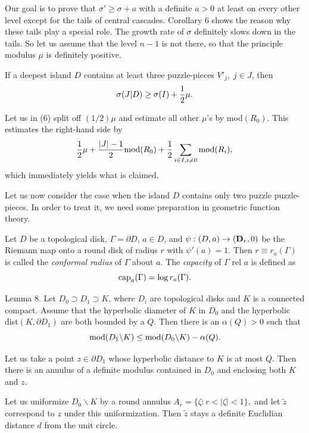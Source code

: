 \medskip{}
Our goal is to prove that $\sigma'\geq\sigma+a$ with
a definite $a>0$ at least on every other level except for the tails
of central cascades.
Corollary 6 shows the reason why these tails play a special
role. The  growth rate of $\sigma$ definitely slows down in the
tails. So let us assume that the level
 $n-1$ is not there, so that the principle modulus $\mu$ is definitely
positive.



 If a deepest island $D$ contains
  at least three puzzle-pieces $V'_j,\; j\in J$,  then
  $$\sigma(J|D)\geq\sigma(I)+{1\over 2}\mu.$$

  Let us in (6) split off
$(1/2)\mu$ and estimate all other $\mu$'s by mod$(R_0)$. 
This estimates the right-hand side by
$${1\over 2}\mu+{|J|-1\over 2}{\rm mod}(R_0)+
{1\over 2}\sum_{i\in I, i\not=0}{\rm mod}(R_i), $$
which immediately yields what is claimed.     \QED

Let us now consider the case when the island $D$ contains
only two puzzle puzzle-pieces. In order to treat it, we need some preparation
in geometric function theory.

\medskip{} 
Let $D$ be a topological disk, $\Gamma=\partial D$,
 $a\in D$, and $\psi: (D,a)\rightarrow
({\bf D}_r,0)$ be the Riemann map onto a round disk of radius $r$
with $\psi'(a)=1$.
Then $r\equiv r_a(\Gamma)$ is called the {\sl conformal radius} of $\Gamma$ 
about $a$. The {\sl capacity} of $\Gamma$ rel $a$ is defined as
$${\rm cap}_a(\Gamma)=\log r_a(\Gamma).$$


\proclaim Lemma 8. Let $D_0\supset D_1\supset K$, where $D_i$ are topological
disks and $K$ is a connected compact. Assume that 
the hyperbolic diameter of $K$ in $D_0$ and the hyperbolic 
dist$(K,\partial D_1)$ are both bounded by a $Q$.
  Then there is an $\alpha(Q)>0$
such that
$${\rm mod }(D_1\backslash K)\leq {\rm mod} (D_0\backslash K)-\alpha(Q).  $$

  Let us take a point $z\in \partial D_1$ whose hyperbolic
distance to $K$ is at most $Q$. Then there is an annulus  of a definite
modulus contained in $D_0$ and enclosing both $K$ and $z$. 

Let us uniformize $D_0\backslash K$ by a round annulus
 $A_r=\{\zeta : r<|\zeta|<1\},$
and let $\tilde z$ correspond to $z$ under this uniformization. Then 
$\tilde z$ stays a definite Euclidian distance $d$ from the unit circle.

